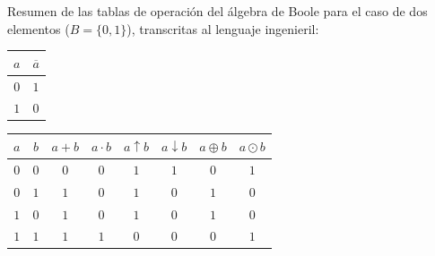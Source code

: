 Resumen de las tablas de operación del álgebra de Boole para el caso de dos elementos ($B=\{0,1\}$), transcritas al lenguaje ingenieril:

\begin{table}[h!]
\centering
\renewcommand{\arraystretch}{1.2}
\begin{tabular}{c||c}
\hline
$a$ & $\overline{a}$ \\
\hline\hline
$0$ & $1$ \\
$1$ & $0$ \\
\hline
\end{tabular}
\qquad
\begin{tabular}{cc||c|c|c|c|c|c}
\hline
$a$ & $b$ & $a + b$ & $a \cdot b$ & $a \uparrow b$ & $a \downarrow b$ & $a \oplus b$ & $a \odot b$ \\
\hline\hline
$0$ & $0$ & $0$ & $0$ & $1$ & $1$ & $0$ & $1$ \\
$0$ & $1$ & $1$ & $0$ & $1$ & $0$ & $1$ & $0$ \\
$1$ & $0$ & $1$ & $0$ & $1$ & $0$ & $1$ & $0$ \\
$1$ & $1$ & $1$ & $1$ & $0$ & $0$ & $0$ & $1$ \\
\hline
\end{tabular}
\end{table}

\makeatother
